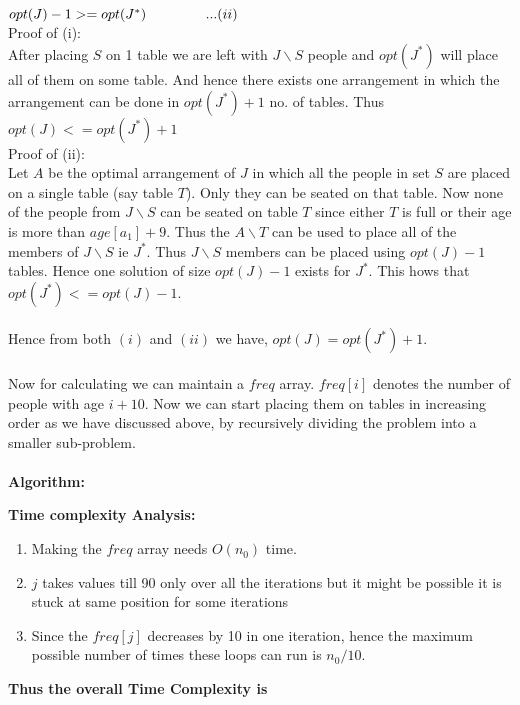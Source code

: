 \documentclass{article}
\begin{document}
$opt(J)-1 >= opt(J^*)\hspace{1.5 cm}...(ii)$\\
Proof of (i):\\
After placing $S$ on 1 table we are left with $J\backslash S$ people and $opt(J^*)$ will place all of them on some table. And hence there exists one arrangement in which the arrangement can be done in $opt(J^*)+1$ no. of tables. Thus $opt(J) <= opt(J^*)+1$\\
Proof of (ii):\\
Let $A$ be the optimal arrangement of $J$ in which all the people in set $S$ are placed on a single table (say table $T$). Only they can be seated on that table. Now none of the people from $J\backslash S$ can be seated on table $T$ since either $T$ is full or their age is more than $age[a_1]+9$. Thus the $A\backslash T$ can be used to place all of the members of $J\backslash S$ ie $J^*$. Thus $J\backslash S$ members can be placed using $opt(J)-1$ tables. Hence one solution of size $opt(J)-1$ exists for $J^*$. This hows that $opt(J^*) <= opt(J)-1$.
\\\\
Hence from both $(i)$ and $(ii)$ we have, $opt(J)= opt(J^*)+1$.
\\\\
Now for calculating we can maintain a $freq$ array. $freq[i]$ denotes the number of people with age $i+10$. Now we can start placing them on tables in increasing order as we have discussed above, by recursively dividing the problem into a smaller sub-problem.
\\\\
\textbf{Algorithm:}

\textbf{Time complexity Analysis:}
\begin{enumerate}
    \item Making the $freq$ array needs $O(n_0)$ time.
    \item $j$ takes values till 90 only over all the iterations but it might be possible it is stuck at same position for some iterations
    \item Since the $freq[j]$ decreases by 10 in one iteration, hence the maximum possible number of times these loops can run is $n_0/10$.
\end{enumerate}
\textbf{Thus the overall Time Complexity is }
\end{document}
